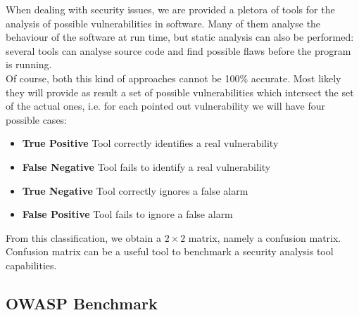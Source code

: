 \documentclass[../Report.tex]{subfiles}
\begin{document}
When dealing with security issues, we are provided a pletora of tools for the analysis of possible vulnerabilities in software. Many of them analyse the behaviour of the software at run time, but static analysis can also be performed: several tools can analyse source code and find possible flaws before the program is running. \\
Of course, both this kind of approaches cannot be 100\% accurate. Most likely they will provide as result a set of possible vulnerabilities which intersect the set of the actual ones, i.e. for each pointed out vulnerability we will have four possible cases:

\begin{itemize}
	\item \textbf{True Positive} Tool correctly identifies a real vulnerability
	\item \textbf{False Negative} Tool fails to identify a real vulnerability
	\item \textbf{True Negative} Tool correctly ignores a false alarm
	\item \textbf{False Positive} Tool fails to ignore a false alarm
\end{itemize}

From this classification, we obtain a $2 \times 2$ matrix, namely a confusion matrix. Confusion matrix can be a useful tool to benchmark a security analysis tool capabilities. \\

\subsection{OWASP Benchmark}\label{sub:owasp}


\end{document}
